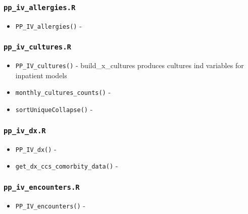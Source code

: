 \documentclass[
]{book}
\providecommand{\tightlist}{%
  \setlength{\itemsep}{0pt}\setlength{\parskip}{0pt}}
\begin{document}
\hypertarget{pp_iv_allergies.r}{%
\subsubsection{\texorpdfstring{\texttt{pp\_iv\_allergies.R}}{pp\_iv\_allergies.R}}\label{pp_iv_allergies.r}}

\begin{itemize}
\tightlist
\item
  \texttt{PP\_IV\_allergies()} -
\end{itemize}

\hypertarget{pp_iv_cultures.r}{%
\subsubsection{\texorpdfstring{\texttt{pp\_iv\_cultures.R}}{pp\_iv\_cultures.R}}\label{pp_iv_cultures.r}}

\begin{itemize}
\tightlist
\item
  \texttt{PP\_IV\_cultures()} - build\_x\_cultures produces cultures ind variables for inpatient models
\item
  \texttt{monthly\_cultures\_counts()} -
\item
  \texttt{sortUniqueCollapse()} -
\end{itemize}

\hypertarget{pp_iv_dx.r}{%
\subsubsection{\texorpdfstring{\texttt{pp\_iv\_dx.R}}{pp\_iv\_dx.R}}\label{pp_iv_dx.r}}

\begin{itemize}
\tightlist
\item
  \texttt{PP\_IV\_dx()} -
\item
  \texttt{get\_dx\_ccs\_comorbity\_data()} -
\end{itemize}

\hypertarget{pp_iv_encounters.r}{%
\subsubsection{\texorpdfstring{\texttt{pp\_iv\_encounters.R}}{pp\_iv\_encounters.R}}\label{pp_iv_encounters.r}}

\begin{itemize}
\tightlist
\item
  \texttt{PP\_IV\_encounters()} -
\end{itemize}
\end{document}
